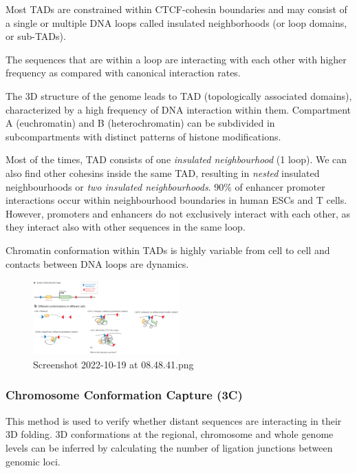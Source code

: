 Most TADs are constrained within CTCF-cohesin boundaries and may consist of a single or multiple DNA loops called insulated neighborhoods (or loop domains, or sub-TADs).


The sequences that are within a loop are interacting with each other with higher frequency as compared with canonical interaction rates.

The 3D structure of the genome leads to TAD (topologically associated domains), characterized by a high frequency of DNA interaction within them. Compartment A (euchromatin) and B (heterochromatin) can be subdivided in subcompartments with distinct patterns of histone modifications.

Most of the times, TAD consists of one \emph{insulated neighbourhood} (1 loop). We can also find other cohesins inside the same TAD, resulting in \emph{nested} insulated neighbourhoods or \emph{two insulated neighbourhoods}. 90\% of enhancer promoter interactions occur within neighbourhood boundaries in human ESCs and T cells. However, promoters and enhancers do not exclusively interact with each other, as they interact also with other sequences in the same loop.

Chromatin conformation within TADs is highly variable from cell to cell and contacts between DNA loops are dynamics.

\begin{figure}
\centering
\includegraphics[width=0.5\textwidth]{../_resources/Screenshot_2022-10-19_at_08-48-41.png}
\caption{Screenshot 2022-10-19 at 08.48.41.png}
\end{figure}

\hypertarget{chromosome-conformation-capture-3c}{%
\subsubsection{Chromosome Conformation Capture (3C)}\label{chromosome-conformation-capture-3c}}

This method is used to verify whether distant sequences are interacting in their 3D folding. 3D conformations at the regional, chromosome and whole genome levels can be inferred by calculating the number of ligation junctions between genomic loci.

